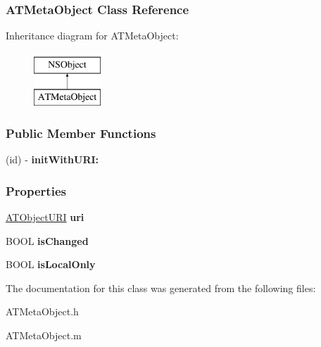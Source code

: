 \hypertarget{interface_a_t_meta_object}{
\subsubsection{ATMetaObject Class Reference}
\label{interface_a_t_meta_object}
}
Inheritance diagram for ATMetaObject:\begin{figure}[h]
\begin{center}
\leavevmode
\includegraphics[height=2.000000cm]{interface_a_t_meta_object}
\end{center}
\end{figure}
\subsubsection*{Public Member Functions}
\begin{DoxyCompactItemize}
\item 
\hypertarget{interface_a_t_meta_object_afa20cebbc71d616926540f55230ed5ab}{
(id) -\/ {\bfseries initWithURI:}}
\label{interface_a_t_meta_object_afa20cebbc71d616926540f55230ed5ab}

\end{DoxyCompactItemize}
\subsubsection*{Properties}
\begin{DoxyCompactItemize}
\item 
\hypertarget{interface_a_t_meta_object_a7ecba236000b74241ae3931ccfc3e149}{
\hyperlink{struct___a_t_object_u_r_i}{ATObjectURI} {\bfseries uri}}
\label{interface_a_t_meta_object_a7ecba236000b74241ae3931ccfc3e149}

\item 
\hypertarget{interface_a_t_meta_object_a45ed797e32382c7b79b99aba02c83ed1}{
BOOL {\bfseries isChanged}}
\label{interface_a_t_meta_object_a45ed797e32382c7b79b99aba02c83ed1}

\item 
\hypertarget{interface_a_t_meta_object_ae63d1be418eb4fc20c2ac9e2996ad963}{
BOOL {\bfseries isLocalOnly}}
\label{interface_a_t_meta_object_ae63d1be418eb4fc20c2ac9e2996ad963}

\end{DoxyCompactItemize}


The documentation for this class was generated from the following files:\begin{DoxyCompactItemize}
\item 
ATMetaObject.h\item 
ATMetaObject.m\end{DoxyCompactItemize}
